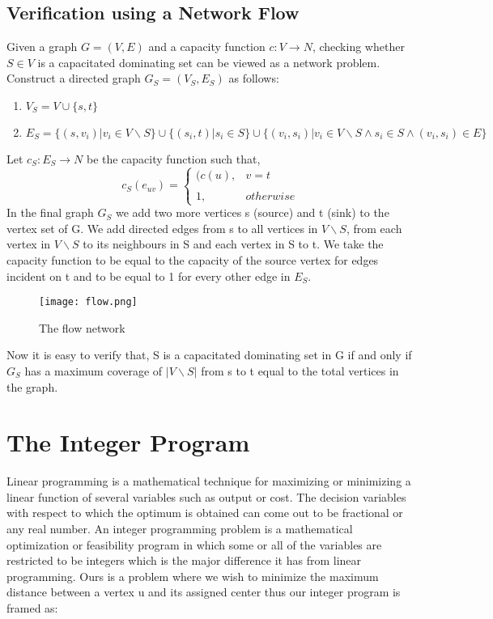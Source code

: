 \documentclass[12pt,a4paper,onecolumn]{article}
\begin{document}
\subsection{Verification using a Network Flow }
Given a graph $G = (V,E)$ and a capacity function $c : V \rightarrow N$, checking whether $S \in V$ is a capacitated dominating set can be viewed as a network problem. Construct a directed graph $G_S = (V_S,E_S)$ as follows:\begin{enumerate} 
\item $V_S = V \cup \{s,t\}$
\item $E_S = \{(s,v_i) | v_i \in V \backslash S \} \cup \{(s_i,t) | s_i \in S \}\cup \{(v_i,s_i) | v_i \in V \backslash S \wedge s_i \in S \wedge (v_i,s_i) \in E \}$\end{enumerate} Let $c_S : E_S \rightarrow N$ be the capacity function such that, $$c_S(e_{uv}) =\left\{ \begin{array}{cc}(c(u),  &  v = t \\\\ 1, & otherwise \end{array}\right.$$
In the final graph $G_S$ we add two more vertices s (source) and t (sink) to the vertex set of G. We add directed edges from s to all vertices in $V \backslash S$, from each vertex in $V \backslash S$ to its neighbours in S and each vertex in S to t. We take the capacity function to be equal to the capacity of the source vertex for edges incident on t and to be equal to 1 for every other edge in $E_S$. \\
\begin{center}
 \begin{figure}[H]
 \begin{center}
 \texttt{[image: flow.png]}
 \end{center}
  \caption{The flow network}
  \label{Figure 1}
\end{figure}
 \end{center} Now it is easy to verify that, S is a capacitated dominating set in G if and only if $G_S$ has a maximum coverage of $|V \backslash S|$ from s to t equal to the total vertices in the graph. 

\section{The Integer Program}
Linear programming is a mathematical technique for maximizing or minimizing a linear function of several variables such as output or cost. The decision variables with respect to which the optimum is obtained can come out to be fractional or any real number. An integer programming problem is a mathematical optimization or feasibility program in which
some or all of the variables are restricted to be integers which is the major difference it has from linear programming. Ours is a problem where we
wish to minimize the maximum distance between a vertex u and its assigned center thus our integer program is framed as:
\\
\end{document}
